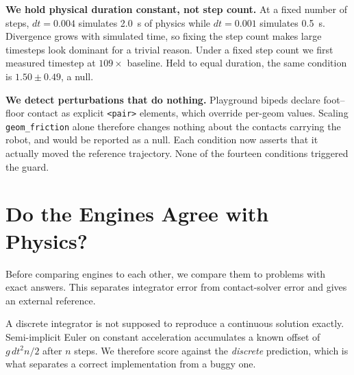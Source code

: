 \documentclass[conference]{IEEEtran}
\begin{document}
\textbf{We hold physical duration constant, not step count.} At a fixed
number of steps, $dt=0.004$ simulates 2.0~s of physics while $dt=0.001$
simulates 0.5~s. Divergence grows with simulated time, so fixing the step
count makes large timesteps look dominant for a trivial reason. Under a
fixed step count we first measured timestep at $109\times$ baseline. Held
to equal duration, the same condition is $1.50\pm0.49$, a null.

\textbf{We detect perturbations that do nothing.} Playground bipeds
declare foot--floor contact as explicit \verb|<pair>| elements, which
override per-geom values. Scaling \verb|geom_friction| alone therefore
changes nothing about the contacts carrying the robot, and would be
reported as a null. Each condition now asserts that it actually moved the
reference trajectory. None of the fourteen conditions triggered the guard.

\section{Do the Engines Agree with Physics?}
\label{sec:groundtruth}

Before comparing engines to each other, we compare them to problems with
exact answers. This separates integrator error from contact-solver error
and gives an external reference.

A discrete integrator is not supposed to reproduce a continuous solution
exactly. Semi-implicit Euler on constant acceleration accumulates a known
offset of $g\,dt^2 n/2$ after $n$ steps. We therefore score against the
\emph{discrete} prediction, which is what separates a correct
implementation from a buggy one.
\end{document}
